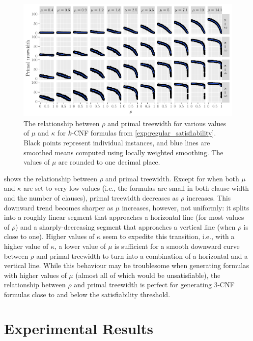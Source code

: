 \documentclass{article}
\theoremstyle{definition}
\theoremstyle{remark}
\begin{document}
\begin{figure}
  \centering
  \includegraphics{regular_repetitiveness.pdf}
  \caption{The relationship between $\rho$ and primal treewidth for various
    values of $\mu$ and $\kappa$ for $k$-CNF formulas from
    \cref{exp:regular_satisfiability}. Black points represent individual
    instances, and blue lines are smoothed means computed using locally weighted
    smoothing. The values of $\mu$ are rounded to one decimal place.}
  \label{fig:regular_repetitiveness}
\end{figure}

 shows the relationship between $\rho$ and
primal treewidth. Except for when both $\mu$ and $\kappa$ are set to very low
values (i.e., the formulas are small in both clause width and the number of
clauses), primal treewidth decreases as $\rho$ increases. This downward trend
becomes sharper as $\mu$ increases, however, not uniformly: it splits into a
roughly linear segment that approaches a horizontal line (for most values of
$\rho$) and a sharply-decreasing segment that approaches a vertical line (when
$\rho$ is close to one). Higher values of $\kappa$ seem to expedite this
transition, i.e., with a higher value of $\kappa$, a lower value of $\mu$ is
sufficient for a smooth downward curve between $\rho$ and primal treewidth to
turn into a combination of a horizontal and a vertical line. While this
behaviour may be troublesome when generating formulas with higher values of
$\mu$ (almost all of which would be unsatisfiable), the relationship between
$\rho$ and primal treewidth is perfect for generating 3-CNF formulas close to
and below the satisfiability threshold.

\section{Experimental Results} \label{sec:experiments}
\end{document}
